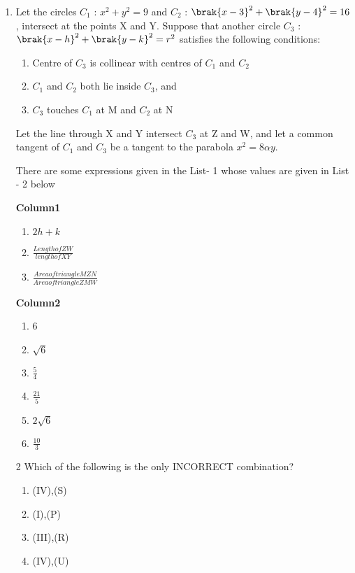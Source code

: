 \documentclass[journal,12pt,twocolumn]{IEEEtran}
\theoremstyle{remark}
\begin{document}
\begin{enumerate}
\item Let the circles $C_{1}$ : $x^2+y^2=9$ and $C_{2}$ : $\brak{x-3}^2+\brak{y-4}^2=16$, intersect at the points X and Y. Suppose that another circle $C_{3}$ : $\brak{x-h}^2+\brak{y-k}^2=r^2$ satisfies the following conditions: 

\begin{enumerate}[label=(\roman*)]                       
\item Centre of $C_{3}$ is collinear with centres of $C_{1}$ and $C_{2}$                         
\item $C_{1}$ and $C_{2}$ both lie inside $C_{3}$, and                                            
\item $C_{3}$ touches $C_{1}$ at M and $C_{2}$ at N
\end{enumerate}                              
Let the line through X and Y intersect $C_{3}$ at Z and W, and let a common tangent of $C_{1}$ and $C_{3}$ be a tangent to the parabola $x^2=8\alpha y$.

There are some expressions given in the List- 1 whose values are given in List - 2 below
		

\begin{multicols}{2}


	\textbf{Column{1}}

\begin{enumerate}[label=(\Alph*)]

 \item $2h+k$
 \item $\frac{Length of ZW}{length of XY}$
 \item $\frac{Area of triangle MZN}{Area of triangle ZMW}$                       \end{enumerate}                             
 \columnbreak
 \textbf{Column{2}}

 \begin{enumerate}[label=(\alph*) , start=16]                                              
 \item 6                                      
 \item $\sqrt{6}$                              
 \item $\frac{5}{4}$                          
 \item $\frac{21}{5}$                          
 \item $2\sqrt{6}$               
 \item $\frac{10}{3}$                         
 \end{enumerate}     
\end{multicols}{2}
 Which of the following is the only INCORRECT combination?


\begin{enumerate}[label=(\alph*)] 
 \item (IV),(S)
 \item (I),(P)
 \item (III),(R)    
 \item (IV),(U)
  
  \end{enumerate}
  \end{enumerate}
 
 
\end{document}
